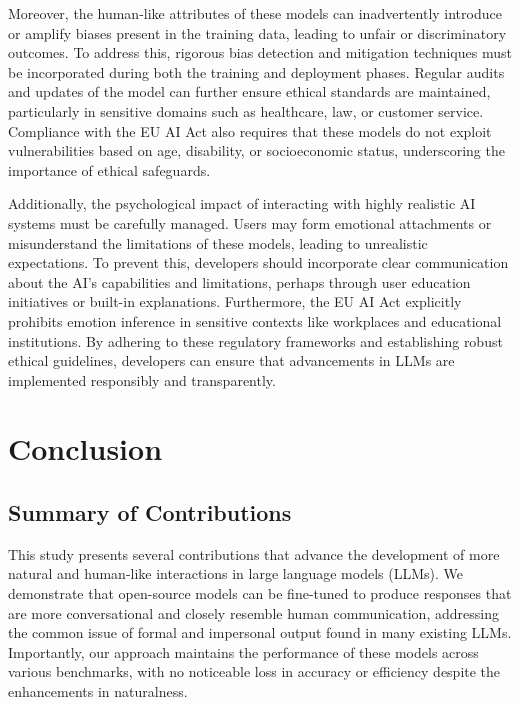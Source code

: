 \documentclass{article}
\begin{document}
Moreover, the human-like attributes of these models can inadvertently introduce or amplify biases present in the training data, leading to unfair or discriminatory outcomes. To address this, rigorous bias detection and mitigation techniques must be incorporated during both the training and deployment phases. Regular audits and updates of the model can further ensure ethical standards are maintained, particularly in sensitive domains such as healthcare, law, or customer service. Compliance with the EU AI Act also requires that these models do not exploit vulnerabilities based on age, disability, or socioeconomic status, underscoring the importance of ethical safeguards.

Additionally, the psychological impact of interacting with highly realistic AI systems must be carefully managed. Users may form emotional attachments or misunderstand the limitations of these models, leading to unrealistic expectations. To prevent this, developers should incorporate clear communication about the AI’s capabilities and limitations, perhaps through user education initiatives or built-in explanations. Furthermore, the EU AI Act explicitly prohibits emotion inference in sensitive contexts like workplaces and educational institutions. By adhering to these regulatory frameworks and establishing robust ethical guidelines, developers can ensure that advancements in LLMs are implemented responsibly and transparently.


\section{Conclusion}
\subsection{Summary of Contributions}

This study presents several contributions that advance the development of more natural and human-like interactions in large language models (LLMs). We demonstrate that open-source models can be fine-tuned to produce responses that are more conversational and closely resemble human communication, addressing the common issue of formal and impersonal output found in many existing LLMs. Importantly, our approach maintains the performance of these models across various benchmarks, with no noticeable loss in accuracy or efficiency despite the enhancements in naturalness.
\end{document}

